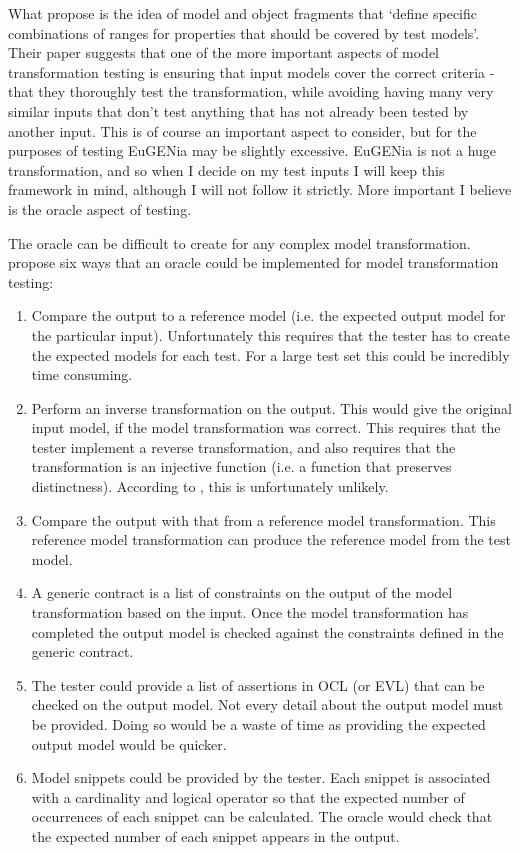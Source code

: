 What \citet{fleureyMTInputs} propose is the idea of model and object fragments that `define specific combinations of ranges for properties that should be covered by test models'. Their paper suggests that one of the more important aspects of model transformation testing is ensuring that input models cover the correct criteria - that they thoroughly test the transformation, while avoiding having many very similar inputs that don't test anything that has not already been tested by another input. This is of course an important aspect to consider, but for the purposes of testing EuGENia may be slightly excessive. EuGENia is not a huge transformation, and so when I decide on my test inputs I will keep this framework in mind, although I will not follow it strictly. More important I believe is the oracle aspect of testing.

The oracle can be difficult to create for any complex model transformation. \citet{mttOracleIssue} propose six ways that an oracle could be implemented for model transformation testing:

\begin{enumerate}
	\item Compare the output to a reference model (i.e. the expected output model for the particular input). Unfortunately this requires that the tester has to create the expected models for each test. For a large test set this could be incredibly time consuming.
	\item Perform an inverse transformation on the output. This would give the original input model, if the model transformation was correct. This requires that the tester implement a reverse transformation, and also requires that the transformation is an injective function (i.e. a function that preserves distinctness). According to \citet{mttOracleIssue}, this is unfortunately unlikely.
	\item Compare the output with that from a reference model transformation. This reference model transformation can produce the reference model from the test model. 
	\item A generic contract is a list of constraints on the output of the model transformation based on the input. Once the model transformation has completed the output model is checked against the constraints defined in the generic contract.
	\item The tester could provide a list of assertions in OCL (or EVL) that can be checked on the output model. Not every detail about the output model must be provided. Doing so would be a waste of time as providing the expected output model would be quicker.
	\item Model snippets could be provided by the tester. Each snippet is associated with a cardinality and logical operator so that the expected number of occurrences of each snippet can be calculated. The oracle would check that the expected number of each snippet appears in the output. 
\end{enumerate}

